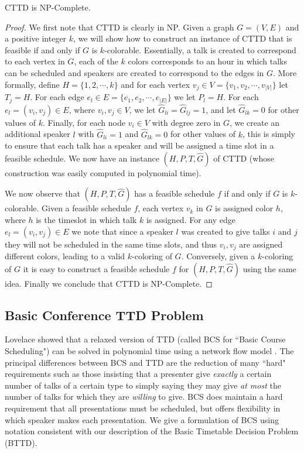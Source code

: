 \documentclass{svjour3}                     %
\begin{document}
\begin{proposition}\label{cttd_np}
	CTTD is NP-Complete.
\end{proposition}
\begin{proof}
We first note that CTTD is clearly in NP.  
Given a graph $G=(V,E)$ and a positive integer $k$, we will show how to construct an instance of CTTD that is feasible if and only if $G$ is $k$-colorable.
Essentially, a talk is created to correspond to each vertex in $G$, each of the $k$ colors corresponds to an hour in which talks can be scheduled and speakers are created to correspond to the edges in $G$.
More formally, define $H=\{1, 2, \cdots, k\}$ and for each vertex $v_j \in V=\{v_1, v_2, \cdots, v_{|V|}\}$ let $T_j = H$. 
For each edge $e_l \in E=\{e_1, e_2, \cdots, e_{|E|}\}$ we let $P_l = H$. 
For each $e_l = (v_i,v_j)\in E$, where $v_i,v_j \in V$, we let $\hat G_{li} = \hat G_{lj} = 1$, and let $\hat G_{lk}=0$ for other values of $k$. 
Finally, for each node $v_i\in V$ with degree zero in $G$, we create an additional speaker $l$ with $\hat G_{li} = 1$ and $\hat G_{lk}=0$ for other values of $k$, this is simply to ensure that each talk has a speaker and will be assigned a time slot in a feasible schedule.
We now have an instance $(H, P, T, \hat G)$ of CTTD (whose construction was easily computed in polynomial time). 

We now observe that $(H, P, T, \hat G)$ has a feasible schedule $f$ if and only if $G$ is $k$-colorable.
Given a feasible schedule $f$, each vertex $v_k$ in $G$ is assigned color $h$, where $h$ is the timeslot in which talk $k$ is assigned.
For any edge $e_l=(v_i,v_j)\in E$ we note that since a speaker $l$ was created to give talks $i$ and $j$ they will not be scheduled in the same time slots, and thus $v_i,v_j$ are assigned different colors, leading to a valid $k$-coloring of $G$.
Conversely, given a $k$-coloring of $G$ it is easy to construct a feasible schedule $f$ for $(H, P, T, \hat G)$ using the same idea.
Finally we conclude that CTTD is NP-Complete.
\end{proof}


\subsection{Basic Conference TTD Problem}
Lovelace showed that a relaxed version of TTD (called BCS for ``Basic Course Scheduling") can be solved in polynomial time using a network flow model \cite{lovelace2010}. 
The principal differences between BCS and TTD are the reduction of many ``hard" requirements such as those insisting that a presenter give \emph{exactly} a certain number of talks of a certain type to simply saying they may give \emph{at most} the number of talks for which they are \emph{willing} to give. 
BCS does maintain a hard requirement that all presentations must be scheduled, but offers flexibility in which speaker makes each presentation.
We give a formulation of BCS using notation consistent with our description of the Basic Timetable Decision Problem (BTTD).
\end{document}
